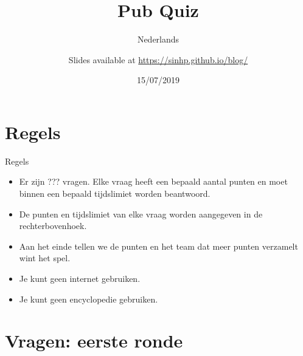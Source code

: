 \documentclass[10pt]{beamer}
\title{Pub Quiz}
\subtitle{Nederlands}
\date{15/07/2019}
\date{}
\author{Slides available at \url{https://sinhp.github.io/blog/}}
\institute{Dizzy}
\begin{document}
\maketitle


\section{Regels}

\begin{frame}[fragile]{Regels}
    \begin{itemize}
        \item Er zijn ??? vragen. Elke vraag heeft een bepaald aantal punten en moet binnen een bepaald tijdslimiet worden beantwoord.
        \item De punten en tijdslimiet van elke vraag worden aangegeven in de rechterbovenhoek. 
        \item Aan het einde tellen we de punten en het team dat meer punten verzamelt wint het spel.
        \item Je kunt geen internet gebruiken.
        \item Je kunt geen encyclopedie gebruiken.
    \end{itemize}
\end{frame}


\section{Vragen: eerste ronde}

\begin{frame}{}
\end{frame}
\end{document}
